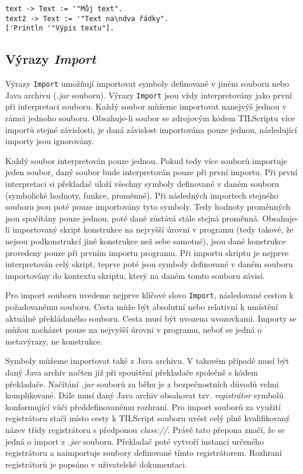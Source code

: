 \begin{lstlisting}[caption={Příklad využití typu Text}]
text -> Text := '"Můj text".
text2 -> Text := '"Text na\ndva řádky".
['Println '"Výpis textu"].
\end{lstlisting}

\subsection{Výrazy \textit{Import}}

Výrazy \lstinline{Import} umožňují importovat symboly definované v jiném souboru nebo Java archivu
(\textit{.jar} souboru). Výrazy \lstinline{Import} jsou vždy interpretovány jako první při
interpretaci souboru. Každý soubor můžeme importovat nanejvýš jednou v rámci jednoho souboru.
Obsahuje-li soubor se zdrojovým kódem TILScriptu více importů stejné závislosti, je daná závislost
importována pouze jednou, následující importy jsou ignorovány.

Každý soubor interpretován pouze jednou. Pokud tedy více souborů importuje jeden soubor, daný
soubor bude interpretován pouze při první importu. Při první interpretaci si překladač uloží
všechny symboly definované v daném souboru (symbolické hodnoty, funkce, proměnné). Při následných
importech stejného souboru jsou poté pouze importovány tyto symboly. Tedy hodnoty proměnných jsou
spočítány pouze jednou, poté dané zůstává stále stejná proměnná. Obsahuje-li importovaný skript
konstrukce na nejvyšší úrovni v programu (tedy takové, že nejsou podkonstrukcí jiné konstrukce než
sebe samotné), jsou dané konstrukce provedeny pouze při prvním importu programu. Při importu
skriptu je nejprve interpretován celý skript, teprve poté jsou symboly definované v daném souboru
importovány do kontextu skriptu, který na daném tomto souboru závisí.

Pro import souboru uvedeme nejprve klíčové slovo \lstinline{Import}, následované cestou
k požadovanému souboru. Cesta může být absolutní nebo relativní k umístění aktuálně překládaného
souboru. Cesta musí být uvozena uvozovkami. Importy se můžou nacházet pouze na nejvyšší úrovni
v programu, neboť se jedná o metavýrazy, ne konstrukce.

Symboly můžeme importovat také z Java archivu. V takovém případě musí být daný Java archiv načten
již při spouštění překladače společně s kódem překladače. Načítání \textit{.jar} souborů za běhu
je z bezpečnostních důvodů velmi komplikované. Dále musí daný Java archiv obsahovat tzv.
\textit{registrátor} symbolů konformující vůči předdefinovanému rozhraní. Pro import souborů
za využití registrátoru stačí místo cesty k TILScript souboru uvést celý plně kvalifikovaný název
třídy registrátoru s předponou \textit{class://}. Právě tato přepona značí, že se jedná o import
z \textit{.jar} souboru. Překladač poté vytvoří instanci určeného registrátoru a naimportuje
soubory definované tímto registrátorem. Rozhraní registrátorů je popsáno v uživatelské dokumentaci.


